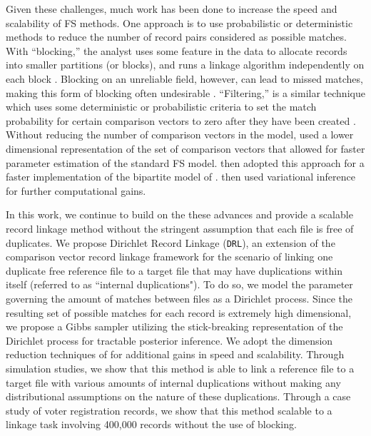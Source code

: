 \documentclass[12pt,letterpaper]{article}
\newcommand{\1}[1]{\mathbb{I}\!\left[#1\right]} %
\begin{document}
Given these challenges, much work has been done to increase the speed and scalability of FS methods. One approach is to use probabilistic or deterministic methods to reduce the number of record pairs considered as possible matches. With ``blocking,'' the analyst uses some feature in the data to allocate records into smaller partitions (or blocks), and runs a linkage algorithm independently on each block \citep{christen_data_2012}. Blocking on an unreliable field, however, can lead to missed matches, making this form of blocking often undesirable \citep{steorts_comparison_2014}. ``Filtering,'' is a similar technique which uses some deterministic or probabilistic criteria to set the match probability for certain comparison vectors to zero after they have been created \citep{murray2016probabilistic, mcveigh2019scaling}. Without reducing the number of comparison vectors in the model, \cite{enamorado_using_2019} used a lower dimensional representation of the set of comparison vectors that allowed for faster parameter estimation of the standard FS model. \cite{kundinger_2023} then adopted this approach for a faster implementation of the bipartite model of \cite{sadinle_bayesian_2017}. \cite{kundinger_2024_vabl} then used variational inference for further computational gains.
 
In this work, we continue to build on the these advances and provide a scalable record linkage method without the stringent assumption that each file is free of duplicates. We propose Dirichlet Record Linkage (\texttt{DRL}), an extension of the comparison vector record linkage framework for the scenario of linking one duplicate free reference file to a target file that may have duplications within itself (referred to as ``internal duplications"). To do so, we model the parameter governing the amount of matches between files as a Dirichlet process. Since the resulting set of possible matches for each record is extremely high dimensional, we propose a Gibbs sampler utilizing the stick-breaking representation of the Dirichlet process for tractable posterior inference. We adopt the dimension reduction techniques of \cite{kundinger_2023} for additional gains in speed and scalability. Through simulation studies, we show that this method is able to link a reference file to a target file with various amounts of internal duplications without making any distributional assumptions on the nature of these duplications. Through a case study of voter registration records, we show that this method scalable to a linkage task involving 400,000 records without the use of blocking. 
\end{document}
